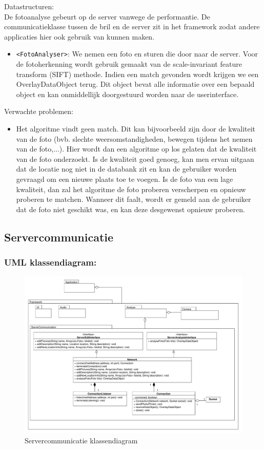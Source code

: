 \documentclass[12pt,a4paper,oneside]{article}
\begin{document}
Datastructuren: \\
De fotoanalyse gebeurt op de server vanwege de performantie. De communicatieklasse tussen de bril en de server zit in het framework zodat andere applicaties hier ook gebruik van kunnen maken.
\begin{itemize}
\item \verb$<FotoAnalyser>$: We nemen een foto en sturen die door naar de server. Voor de fotoherkenning wordt gebruik gemaakt van de scale-invariant feature transform (SIFT) methode. Indien een match gevonden wordt krijgen we een OverlayDataObject terug. Dit object bevat alle informatie over een bepaald object en kan onmiddellijk doorgestuurd worden naar de userinterface. 
\end{itemize}
Verwachte problemen:
\begin{itemize}
\item Het algoritme vindt geen match. Dit kan bijvoorbeeld zijn door de kwaliteit van de foto (bvb. slechte weersomstandigheden, bewegen tijdens het nemen van de foto,...). Hier wordt dan een algoritme op los gelaten dat de kwaliteit van de foto onderzoekt. Is de kwaliteit goed genoeg, kan men ervan uitgaan dat de locatie nog niet in de databank zit en kan de gebruiker worden gevraagd om een nieuwe plaats toe te voegen. Is de foto van een lage kwaliteit, dan zal het algoritme de foto proberen verscherpen en opnieuw proberen te matchen. Wanneer dit faalt, wordt er gemeld aan de gebruiker dat de foto niet geschikt was, en kan deze desgewenst opnieuw proberen.
\end{itemize}
\subsection{Servercommunicatie}
\subsubsection*{UML klassendiagram:}
\begin{figure}[H]
  \begin{center}
    \includegraphics[scale=0.4]{Servercommunicatie.pdf}
    \caption{Servercommunicatie klassendiagram}
    \label{graph:graph3}
  \end{center}
\end{figure}
\end{document}
